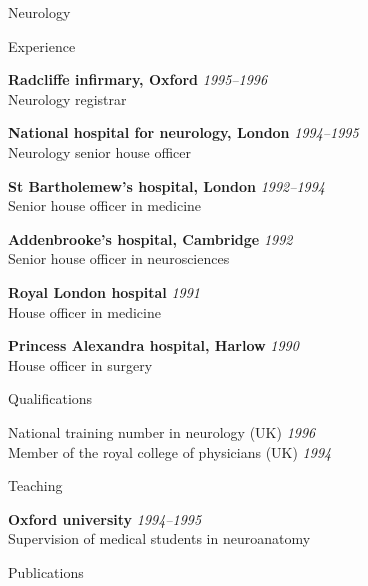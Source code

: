 \documentclass{cv}
\begin{document}
\begin{cvSection}{Neurology}

\begin{cvSubSection}{Experience}

{\bf Radcliffe infirmary, Oxford} \hfill {\em 1995--1996 } \\
Neurology registrar

{\bf National hospital for neurology, London} \hfill {\em 1994--1995 } \\
Neurology senior house officer

{\bf St Bartholemew's hospital, London} \hfill {\em 1992--1994 } \\
Senior house officer in medicine

{\bf Addenbrooke's hospital, Cambridge} \hfill {\em 1992 } \\
Senior house officer in neurosciences

{\bf Royal London hospital} \hfill {\em 1991 } \\
House officer in medicine

{\bf Princess Alexandra hospital, Harlow} \hfill {\em 1990 } \\
House officer in surgery

\end{cvSubSection}

\begin{cvSubSection}{Qualifications}

National training number in neurology (UK) \hfill {\em 1996} \\
Member of the royal college of physicians (UK) \hfill {\em 1994}

\end{cvSubSection}

\begin{cvSubSection}{Teaching}

{\bf Oxford university} \hfill {\em 1994--1995} \\
Supervision of medical students in neuroanatomy

\end{cvSubSection}

\begin{cvSubSection}{Publications}

\printbibliography[heading=none,
    keyword=neurology,
notkeyword=omit]

\end{cvSubSection}

\end{cvSection}
\end{document}
